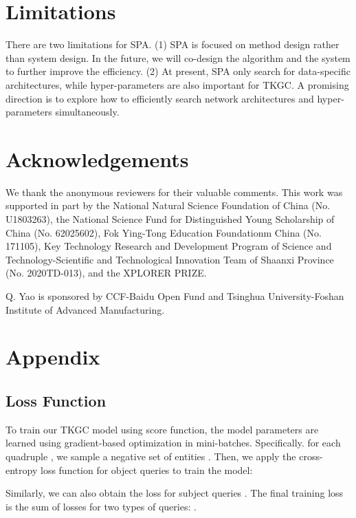 \documentclass[11pt]{article}
\begin{document}
\section*{Limitations}

There are two limitations for SPA. (1) SPA is focused on method design rather than system design. In the future, we will co-design the algorithm and the system to further improve the efficiency. (2) At present, SPA only search for data-specific architectures, while hyper-parameters are also important for TKGC. A promising direction is to explore how to efficiently search network architectures and hyper-parameters simultaneously.

\section*{Acknowledgements}
We thank the anonymous reviewers for their valuable comments. 
This work was supported in part by
the National Natural Science Foundation of China (No. U1803263),
the National Science Fund for Distinguished Young Scholarship of China (No. 62025602),  
Fok Ying-Tong Education Foundationm China (No. 171105), 
Key Technology Research and Development Program of Science and Technology-Scientific and Technological Innovation Team of Shaanxi Province (No. 2020TD-013),
and the XPLORER PRIZE. 

Q. Yao is sponsored by CCF-Baidu Open Fund and Tsinghua University-Foshan Institute of Advanced Manufacturing.



\appendix

\section{Appendix}
\label{sec:appendix}

\subsection{Loss Function}
\label{sec:appendix-loss}

To train our TKGC model using score function, 
the model parameters are learned 
using gradient-based optimization in mini-batches.
Specifically.
for each quadruple ,
we sample a negative set of entities .
Then,
we apply the cross-entropy loss function for object queries to train the model:


Similarly, 
we can also obtain the loss for subject queries . 
The final training loss is the sum of losses for two types of queries: .
\end{document}
